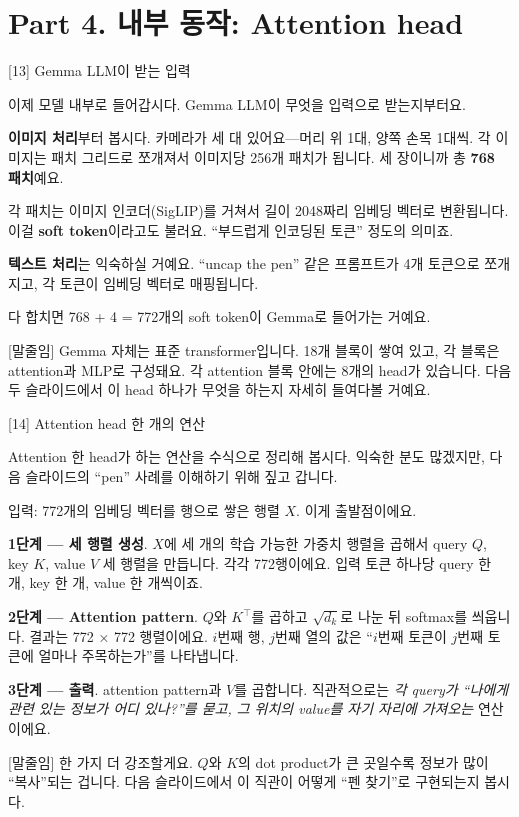\documentclass[aspectratio=169,10pt]{beamer}
\newenvironment{script}{%
  \footnotesize
  \setlength{\parskip}{0.5em}
  \setlength{\parindent}{0pt}
}{}
\begin{document}
\section{Part 4. 내부 동작: Attention head}

\begin{frame}{[13] Gemma LLM이 받는 입력}
\begin{script}
이제 모델 내부로 들어갑시다. Gemma LLM이 무엇을 입력으로 받는지부터요.

\textbf{이미지 처리}부터 봅시다. 카메라가 세 대 있어요---머리 위 1대, 양쪽 손목 1대씩. 각 이미지는 패치 그리드로 쪼개져서 이미지당 256개 패치가 됩니다. 세 장이니까 총 \textbf{768 패치}예요.

각 패치는 이미지 인코더(SigLIP)를 거쳐서 길이 2048짜리 임베딩 벡터로 변환됩니다. 이걸 \textbf{soft token}이라고도 불러요. ``부드럽게 인코딩된 토큰'' 정도의 의미죠.

\textbf{텍스트 처리}는 익숙하실 거예요. ``uncap the pen'' 같은 프롬프트가 4개 토큰으로 쪼개지고, 각 토큰이 임베딩 벡터로 매핑됩니다.

다 합치면 768 + 4 = \alert{772개의 soft token}이 Gemma로 들어가는 거예요.

[말줄임] Gemma 자체는 표준 transformer입니다. 18개 블록이 쌓여 있고, 각 블록은 attention과 MLP로 구성돼요. 각 attention 블록 안에는 8개의 head가 있습니다. 다음 두 슬라이드에서 이 head 하나가 무엇을 하는지 자세히 들여다볼 거예요.
\end{script}
\end{frame}

\begin{frame}{[14] Attention head 한 개의 연산}
\begin{script}
Attention 한 head가 하는 연산을 수식으로 정리해 봅시다. 익숙한 분도 많겠지만, 다음 슬라이드의 ``pen'' 사례를 이해하기 위해 짚고 갑니다.

입력: 772개의 임베딩 벡터를 행으로 쌓은 행렬 $X$. 이게 출발점이에요.

\textbf{1단계 --- 세 행렬 생성}. $X$에 세 개의 학습 가능한 가중치 행렬을 곱해서 query $Q$, key $K$, value $V$ 세 행렬을 만듭니다. 각각 772행이에요. 입력 토큰 하나당 query 한 개, key 한 개, value 한 개씩이죠.

\textbf{2단계 --- Attention pattern}. $Q$와 $K^\top$를 곱하고 $\sqrt{d_k}$로 나눈 뒤 softmax를 씌웁니다. 결과는 772 × 772 행렬이에요. $i$번째 행, $j$번째 열의 값은 ``$i$번째 토큰이 $j$번째 토큰에 얼마나 주목하는가''를 나타냅니다.

\textbf{3단계 --- 출력}. attention pattern과 $V$를 곱합니다. 직관적으로는 \textit{각 query가 ``나에게 관련 있는 정보가 어디 있나?''를 묻고, 그 위치의 value를 자기 자리에 가져오는} 연산이에요.

[말줄임] 한 가지 더 강조할게요. $Q$와 $K$의 dot product가 큰 곳일수록 정보가 많이 ``복사''되는 겁니다. 다음 슬라이드에서 이 직관이 어떻게 ``펜 찾기''로 구현되는지 봅시다.
\end{script}
\end{frame}
\end{document}
